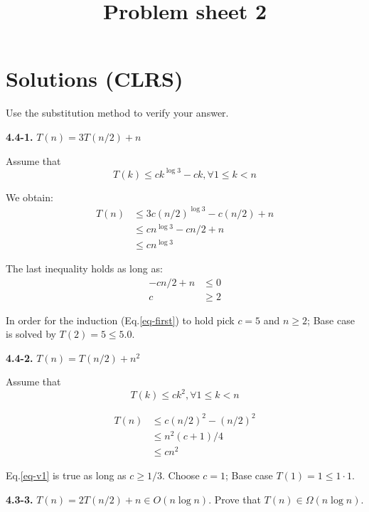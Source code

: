 \documentclass[11pt,a4paper]{article}
\title{Problem sheet 2}
\date{}
\renewcommand{\leq}{\leqslant}
\renewcommand{\geq}{\geqslant}
\begin{document}
\maketitle

\section*{Solutions (CLRS)}
Use the substitution method to verify your answer.


\noindent\textbf{4.4-1.} $T(n) = 3T(n / 2) + n$

Assume that
\begin{equation}
\label{eq-first}
T(k) \leq ck^{\log{3}} -ck, \forall 1 \leq k < n
\end{equation}

We obtain:
\begin{equation}
\begin{split}
T(n) & \leq 3c(n/2)^{\log 3} - c(n/2) + n \\
	 & \leq cn^{\log 3} - cn / 2 + n \\
	 & \leq cn^{\log 3}
\end{split}
\end{equation}

The last inequality holds as long as:
\begin{align*}
	-cn/2 + n & \leq 0 \\
	c & \geq 2
\end{align*}
\break

In order for the induction (Eq.\ref{eq-first}) to hold pick $c = 5$ and $n \geq 2$; Base case is solved by $T(2) = 5 \leq 5.0$.


\noindent\textbf{4.4-2.} $T(n) = T(n / 2) + n^2$

Assume that
\begin{equation}
\label{eq-second}
T(k) \leq ck^2, \forall 1 \leq k < n
\end{equation}

\begin{equation}
\label{eq-v1}
\begin{split}
T(n) & \leq c(n/2)^{2} - (n/2)^2 \\
	 & \leq n^2(c+1)/4 \\
	 & \leq cn^2
\end{split}
\end{equation}

Eq.\ref{eq-v1} is true as long as $c \geq 1/3$. Choose $c=1$; Base case $T(1) = 1 \leq 1 \cdot 1$.


\noindent\textbf{4.3-3.} $T(n) = 2T(n / 2) + n \in O(n \log{n})$. Prove that $T(n) \in \Omega(n \log{n})$.
\end{document}
